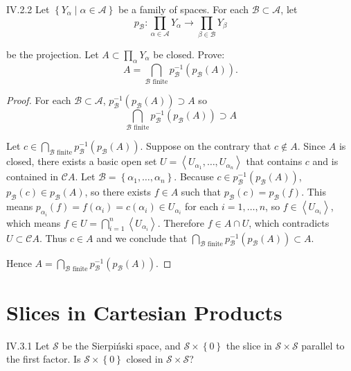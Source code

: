 \begin{problem}{IV.2.2}
Let \( \left\{ Y_{\alpha} \mid \alpha \in \mathscr{A} \right\} \) be a family of spaces. For each \( \mathscr{B} \subset \mathscr{A} \), let
\[
	p_{\mathscr{B}}: \prod_{\alpha \in \mathscr{A}} Y_{\alpha} \to \prod_{\beta \in \mathscr{B}} Y_{\beta}
\]

be the projection. Let \( A \subset \prod_{\alpha} Y_{\alpha} \) be closed. Prove:
\[
	A = \bigcap_{\mathscr{B} \text{ finite}} p_{\mathscr{B}}^{-1}\left( p_{\mathscr{B}}(A) \right).
\]
\end{problem}

\begin{proof}
	For each \( \mathscr{B} \subset \mathscr{A} \), \( p_{\mathscr{B}}^{-1}\left( p_{\mathscr{B}}(A) \right) \supset A \) so
	\[
		\bigcap_{\mathscr{B} \text{ finite}} p_{\mathscr{B}}^{-1}\left( p_{\mathscr{B}}(A) \right) \supset A
	\]

	Let \( c \in \bigcap_{\mathscr{B} \text{ finite}} p_{\mathscr{B}}^{-1}\left( p_{\mathscr{B}}(A) \right) \). Suppose on the contrary that \( c \notin A \). Since \( A \) is closed, there exists a basic open set \( U = \left\langle U_{\alpha_{1}}, \ldots, U_{\alpha_{n}} \right\rangle \) that contains \( c \) and is contained in \( \mathscr{C}A \). Let \( \mathscr{B} = \left\{ \alpha_{1}, \ldots, \alpha_{n} \right\} \). Because \( c \in p_{\mathscr{B}}^{-1}(p_{\mathscr{B}}(A)) \), \( p_{\mathscr{B}}(c) \in p_{\mathscr{B}}(A) \), so there exists \( f \in A \) such that \( p_{\mathscr{B}}(c) = p_{\mathscr{B}}(f) \). This means \( p_{\alpha_{i}}(f) = f(\alpha_{i}) = c(\alpha_{i}) \in U_{\alpha_{i}} \) for each \( i = 1, \ldots, n \), so \( f \in \left\langle U_{\alpha_{i}} \right\rangle \), which means \( f \in U = \bigcap^{n}_{i=1} \left\langle U_{\alpha_{i}} \right\rangle \). Therefore \( f \in A \cap U \), which contradicts \( U \subset \mathscr{C}A \). Thus \( c \in A \) and we conclude that \( \bigcap_{\mathscr{B} \text{ finite}} p_{\mathscr{B}}^{-1}\left( p_{\mathscr{B}}(A) \right) \subset A \).

	Hence \( A = \bigcap_{\mathscr{B} \text{ finite}} p_{\mathscr{B}}^{-1}\left( p_{\mathscr{B}}(A) \right) \).
\end{proof}


\section{Slices in Cartesian Products}

\begin{problem}{IV.3.1}
Let \( \mathscr{S} \) be the Sierpiński space, and \( \mathscr{S} \times \left\{ 0 \right\} \) the slice in \( \mathscr{S} \times \mathscr{S} \) parallel to the first factor. Is \( \mathscr{S} \times \left\{ 0 \right\} \) closed in \( \mathscr{S} \times \mathscr{S} \)?
\end{problem}


